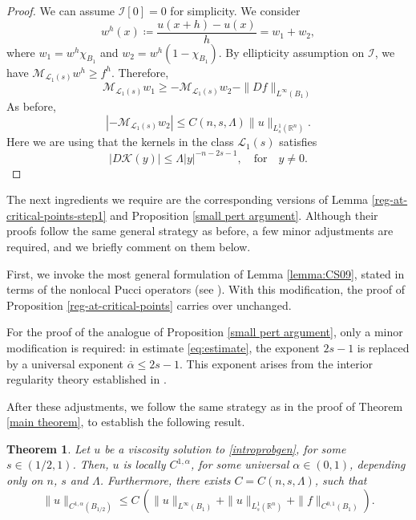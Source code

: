 \documentclass[reqno,11pt]{amsart}
\newtheorem{theorem}{Theorem}[section]
\numberwithin{equation}{section}
\numberwithin{equation}{section}
\begin{document}
\begin{proof}
We can assume $\mathcal{I}[0] = 0$ for simplicity. We consider
$$
    w^h(x) \coloneqq \frac{u(x+h)-u(x)}{h} = w_1 + w_2,
$$
where $w_1 = w^h \chi_{B_1}$ and $w_2 = w^h(1- \chi_{B_1})$. By ellipticity assumption on $\mathcal{I}$, we have $\mathcal{M}_{\mathcal{L}_1(s)} w^h \geq f^h$. Therefore,
$$
    \mathcal{M}_{\mathcal{L}_1(s)} w_1 \geq - \mathcal{M}_{\mathcal{L}_1(s)} w_2 - \|Df\|_{L^\infty(B_1)}
$$
As before,
$$
    \left| - \mathcal{M}_{\mathcal{L}_1(s)} w_2 \right| \leq C(n,s,\Lambda)\|u\|_{L^1_s(\mathbb{R}^n)}.
$$
Here we are using that the kernels in the class $\mathcal{L}_1(s)$ satisfies 
$$|D\mathcal{K}(y)|\leq \Lambda |y|^{-n-2s-1}, \quad \mbox{for} \quad y \not = 0.
$$
\end{proof}

The next ingredients we require are the corresponding versions of Lemma \ref{reg-at-critical-points-step1} and Proposition \ref{small pert argument}. Although their proofs follow the same general strategy as before, a few minor adjustments are required, and we briefly comment on them below. 

First, we invoke the most general formulation of Lemma \ref{lemma:CS09}, stated in terms of the nonlocal Pucci operators (see \cite[Theorem 10.4]{CS09}). With this modification, the proof of Proposition \ref{reg-at-critical-points} carries over unchanged. 

For the proof of the analogue of Proposition \ref{small pert argument}, only a minor modification is required: in estimate \eqref{eq:estimate}, the exponent $2s-1$ is replaced by a universal exponent $\overline{\alpha}\leq 2s-1$. This exponent arises from the interior regularity theory established in \cite{CS11}.

After these adjustments, we follow the same strategy as in the proof of Theorem \ref{main theorem}, to establish the following result.

\begin{theorem}\label{L_1 case}
Let $u$ be a viscosity solution to \eqref{introprobgen}, for some $s\in (1/2,1)$. Then, $u$ is locally $C^{1,\alpha}$, for some universal $\alpha\in (0,1)$, depending only on $n$, $s$ and $\Lambda$. Furthermore, there exists $C = C(n,s,\Lambda)$, such that
$$
    \|u\|_{C^{1,\alpha}(B_{1/2})} \leq C\,\left(\|u\|_{L^\infty(B_1)} + \|u\|_{L^1_s(\mathbb{R}^n)} + \|f\|_{C^{0,1}(B_1)}\right).
$$   
\end{theorem}

\medskip
\end{document}

